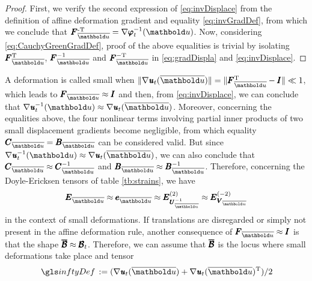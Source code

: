 {\footnotesize
\begin{proof}
First, we verify the second expression of \eqref{eq:invDisplace} from the definition of affine deformation gradient and equality \eqref{eq:invGradDef}, from which we conclude that $\tnr{F}_{\overline{\vto{u}}}^{\text{-T}}=\fua{\nabla\tnr{\varphi}_t^{-1}}{\vto{u}}$. Now, considering \eqref{eq:CauchyGreenGradDef}, proof of the above equalities is trivial by isolating $\tnr{F}_{\overline{\vto{u}}}^{\text{T}}$, $\tnr{F}_{\overline{\vto{u}}}^{-1}$ and $\tnr{F}_{\overline{\vto{u}}}^{-\text{T}}$ in \eqref{eq:gradDispla} and \eqref{eq:invDisplace}.
\end{proof}
}

\noindent A deformation is called small when $\|\fua{\nabla\tnr{\mathit{u}}_t}{\overline{\vto{u}}}\|=\|\tnr{F}_{\overline{\vto{u}}}^{\text{T}} - \tnr{I}\|\ll 1$, which leads to $\tnr{F}_{\overline{\vto{u}}}\approx\tnr{I}$ and then, from \eqref{eq:invDisplace}, we can conclude that $\fua{\nabla\tnr{\mathit{u}}_t^{-1}}{\vto{u}}\approx\fua{\nabla\tnr{\mathit{u}}_t}{\overline{\vto{u}}}$. Moreover, concerning the equalities above, the four nonlinear terms involving partial inner products of two small displacement gradients become negligible, from which equality $\tnr{C}_{\overline{\vto{u}}}=\tnr{B}_{\overline{\vto{u}}}$ can be considered valid. But since $\fua{\nabla\tnr{\mathit{u}}_t^{-1}}{\vto{u}}\approx\fua{\nabla\tnr{\mathit{u}}_t}{\overline{\vto{u}}}$, we can also conclude that  $\tnr{C}_{\overline{\vto{u}}}\approx\tnr{C}_{\overline{\vto{u}}}^{-1}$ and $\tnr{B}_{\overline{\vto{u}}}\approx\tnr{B}_{\overline{\vto{u}}}^{-1}$. Therefore, concerning the Doyle-Ericksen tensors of table \ref{tb:strains}, we have
\begin{equation*}
\tnr{E}_{\overline{\vto{u}}} \approx \tnr{e}_{\overline{\vto{u}}} \approx  \tnr{E}_{\tnr{U}^{-1}_{\overline{\vto{u}}}}^{(2)} \approx \tnr{E}_{\tnr{V}_{\overline{\vto{u}}}}^{(-2)}
\end{equation*}
in the context of small deformations. If translations are disregarded or simply not present in the affine deformation rule, another consequence of $\tnr{F}_{\overline{\vto{u}}}\approx\tnr{I}$ is that the shape $\pmb{\overline{\mathcal{B}}}\approx\pmb{\mathcal{B}}_t$. Therefore, we can assume that $\pmb{\overline{\mathcal{B}}}$ is the locus where small deformations take place and tensor 
\begin{equation}\label{eq:infinitStrain}
\gloref{inftyDef}:=(\fua{\nabla\tnr{\mathit{u}}_t}{\overline{\vto{u}}}+\fua{\nabla\tnr{\mathit{u}}_t}{\overline{\vto{u}}}^{\text{T}})/2
\end{equation}
